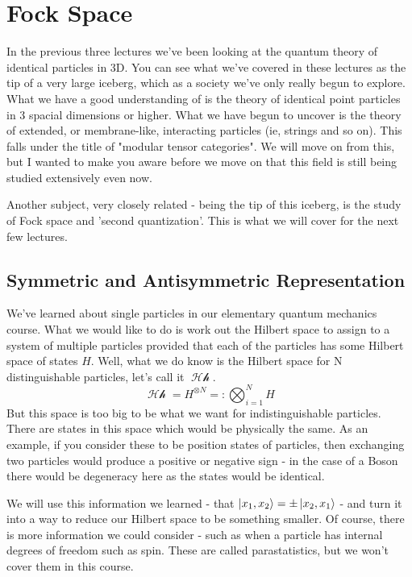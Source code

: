 \documentclass{article}
\DeclareMathOperator{\Hh}{\mathcal{Hh}}
\begin{document}
\section{Fock Space}
In the previous three lectures we've been looking at the quantum theory of identical particles in 3D. You can see what we've covered in these lectures as the tip of a very large iceberg, which as a society we've only really begun to explore. What we have a good understanding of is the theory of identical point particles in 3 spacial dimensions or higher. What we have begun to uncover is the theory of extended, or membrane-like, interacting particles (ie, strings and so on). This falls under the title of "modular tensor categories". We will move on from this, but I wanted to make you aware before we move on that this field is still being studied extensively even now.

Another subject, very closely related - being the tip of this iceberg, is the study of Fock space and 'second quantization'. This is what we will cover for the next few lectures.

\subsection{Symmetric and Antisymmetric Representation}

We've learned about single particles in our elementary quantum mechanics course. What we would like to do is work out the Hilbert space to assign to a system of multiple particles provided that each of the particles has some Hilbert space of states $H$. Well, what we do know is the Hilbert space for N distinguishable particles, let's call it $\Hh$.
\begin{equation}
\Hh = H^{\otimes N} =: \bigotimes_{i=1}^N H
\end{equation}
But this space is too big to be what we want for indistinguishable particles. There are states in this space which would be physically the same. As an example, if you consider these to be position states of particles, then exchanging two particles would produce a positive or negative sign - in the case of a Boson there would be degeneracy here as the states would be identical.

We will use this information we learned - that $\ket{x_1,x_2} = \pm \ket{x_2, x_1}$ - and turn it into a way to reduce our Hilbert space to be something smaller. Of course, there is more information we could consider - such as when a particle has internal degrees of freedom such as spin. These are called parastatistics, but we won't cover them in this course.
\end{document}
